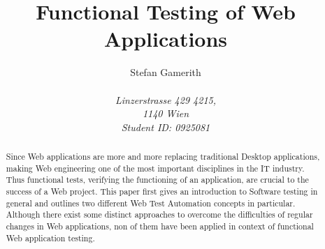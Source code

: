 \documentclass[12pt, notitlepage]{article}
\title{Functional Testing of Web Applications}
\author{Stefan Gamerith\\\\
		\emph{Linzerstrasse 429 4215,}\\
		\emph{1140 Wien}\\
		\emph{Student ID: 0925081}}
\begin{document}
	\maketitle
	\thispagestyle{empty}
	\begin{abstract}
		Since Web applications are more and more replacing traditional Desktop applications, making Web engineering one of the
		most important disciplines in the IT industry. Thus functional tests, verifying the functioning of an application, are
		crucial to the success of a Web project. This paper first gives an introduction to Software testing in general and
		outlines two different Web Test Automation concepts in particular. Although there exist some distinct approaches 
		to overcome the difficulties of regular changes in Web applications, non of them have been applied in context of 
		functional Web application testing.   
	\end{abstract}
	\newpage
	\onehalfspacing
	\tableofcontents
	\thispagestyle{empty}
	\singlespacing
\newpage
\setcounter{page}{1}
\end{document}

